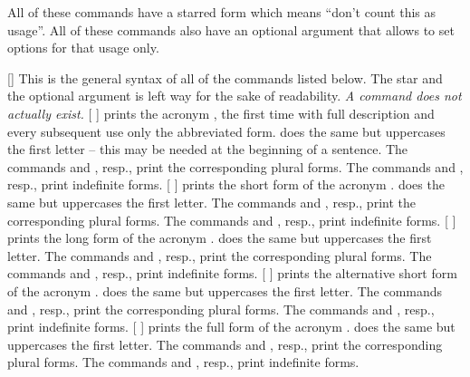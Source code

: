 \documentclass{acro-manual}
\begin{document}
All of these commands have a starred form which means \enquote{don't count
  this as usage}. All of these commands also have an optional argument that
allows to set options for that usage only.
\begin{commands}
  [\sarg{}]
    This is the general syntax of all of the commands listed below.  The star
    and the optional argument is left way for the sake of readability.
    \emph{A command  does not actually exist.}
  [\quad{}\quad{}\quad
    \quad{}\quad{}]
     prints the acronym , the first time with full description
    and every subsequent use only the abbreviated form.  does the same
    but uppercases the first letter -- this may be needed at the beginning of
    a sentence.  The commands  and , resp., print the
    corresponding plural forms.  The commands  and , resp.,
    print indefinite forms.
  [\quad{}\quad{}\quad
    \quad{}\quad{}]
     prints the short form of the acronym .  does the
    same but uppercases the first letter. The commands  and
    , resp., print the corresponding plural forms. The commands
     and , resp., print indefinite forms.
  [\quad{}\quad{}\quad
    \quad{}\quad{}]
     prints the long form of the acronym .  does the
    same but uppercases the first letter. The commands  and
    , resp., print the corresponding plural forms. The commands
     and , resp., print indefinite forms.
  [\quad{}\quad{}\quad
    \quad{}\quad{}]
     prints the alternative short form of the acronym .
     does the same but uppercases the first letter. The commands
     and , resp., print the corresponding plural forms. The
    commands  and , resp., print indefinite forms.
  [\quad{}\quad{}\quad
    \quad{}\quad{}]
     prints the full form of the acronym .  does the
    same but uppercases the first letter. The commands  and
    , resp., print the corresponding plural forms. The commands
     and , resp., print indefinite forms.
\end{commands}
\end{document}
